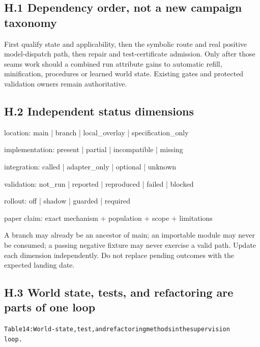\documentclass{article}
\begin{document}
\subsection*{H.1 Dependency order, not a new campaign taxonomy}

First qualify state and applicability, then the symbolic route and real positive model-dispatch path,
then repair and test-certificate admission. Only after those seams work should a combined run
attribute gains to automatic refill, minification, procedures or learned world state. Existing gates and
protected validation owners remain authoritative.

\subsection*{H.2 Independent status dimensions}

\noindent location: main | branch | local\_overlay | specification\_only\par
\noindent implementation: present | partial | incompatible | missing\par
\noindent integration: called | adapter\_only | optional | unknown\par
\noindent validation: not\_run | reported | reproduced | failed | blocked\par
\noindent rollout: off | shadow | guarded | required\par
\noindent paper claim: exact mechanism + population + scope + limitations\par

A branch may already be an ancestor of main; an importable module may never be consumed; a
passing negative fixture may never exercise a valid path. Update each dimension independently. Do
not replace pending outcomes with the expected landing date.




\subsection*{H.3 World state, tests, and refactoring are parts of one loop}

\begingroup\fontsize{7}{8.4}\selectfont
\begin{alltt}
Table 14: World-state, test, and refactoring methods in the supervision
loop.
\end{alltt}\endgroup
\end{document}
